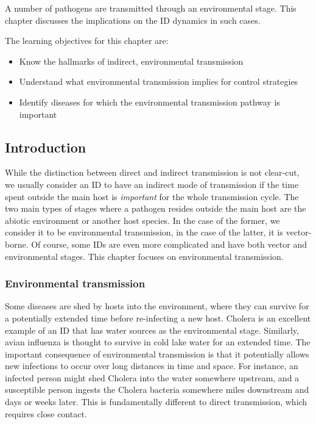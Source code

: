 \documentclass[]{article}
\providecommand{\tightlist}{%
  \setlength{\itemsep}{0pt}\setlength{\parskip}{0pt}}
\theoremstyle{definition}
\theoremstyle{definition}
\theoremstyle{definition}
\theoremstyle{remark}
\begin{document}
A number of pathogens are transmitted through an environmental stage.
This chapter discusses the implications on the ID dynamics in such
cases.

The learning objectives for this chapter are:

\begin{itemize}
\tightlist
\item
  Know the hallmarks of indirect, environmental transmission
\item
  Understand what environmental transmission implies for control
  strategies
\item
  Identify diseases for which the environmental transmission pathway is
  important
\end{itemize}

\subsection{Introduction}\label{introduction-6}

While the distinction between direct and indirect transmission is not
clear-cut, we usually consider an ID to have an indirect mode of
transmission if the time spent outside the main host is \emph{important}
for the whole transmission cycle. The two main types of stages where a
pathogen resides outside the main host are the abiotic environment or
another host species. In the case of the former, we consider it to be
environmental transmission, in the case of the latter, it is
vector-borne. Of course, some IDs are even more complicated and have
both vector and environmental stages. This chapter focuses on
environmental transmission.

\subsubsection{Environmental
transmission}\label{environmental-transmission-2}

Some diseases are shed by hosts into the environment, where they can
survive for a potentially extended time before re-infecting a new host.
Cholera is an excellent example of an ID that has water sources as the
environmental stage. Similarly, avian influenza is thought to survive in
cold lake water for an extended time. The important consequence of
environmental transmission is that it potentially allows new infections
to occur over long distances in time and space. For instance, an
infected person might shed Cholera into the water somewhere upstream,
and a susceptible person ingests the Cholera bacteria somewhere miles
downstream and days or weeks later. This is fundamentally different to
direct transmission, which requires close contact.
\end{document}
